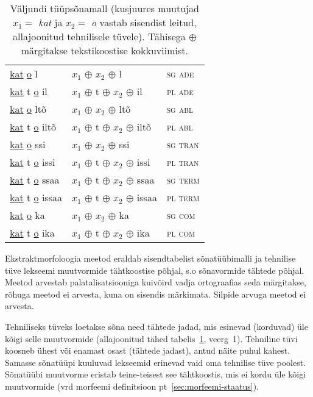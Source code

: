 \documentclass[12pt,a4paper]{article}
\begin{document}
\begin{table}[H]
\begin{minipage}[t]{.55\textwidth}
\begin{tabular}[t]{l l l}
      \underline{kat}   \underline{o} l     & $x_1$ $\oplus$ $x_2$ $\oplus$ l         & \textsc{sg ade} \\
      \underline{kat} t \underline{o} il    & $x_1$ $\oplus$ t $\oplus$ $x_2$ $\oplus$ il    & \textsc{pl ade} \\
      \underline{kat}   \underline{o} ltõ   & $x_1$ $\oplus$ $x_2$ $\oplus$ ltõ       & \textsc{sg abl} \\
      \underline{kat} t \underline{o} iltõ  & $x_1$ $\oplus$ t $\oplus$ $x_2$ $\oplus$ iltõ  & \textsc{pl abl} \\
      \underline{kat}   \underline{o} ssi   & $x_1$ $\oplus$ $x_2$ $\oplus$ ssi       & \textsc{sg tran} \\
      \underline{kat} t \underline{o} issi  & $x_1$ $\oplus$ t $\oplus$ $x_2$ $\oplus$ issi  & \textsc{pl tran} \\
      \underline{kat} t \underline{o} ssaa  & $x_1$ $\oplus$ t $\oplus$ $x_2$ $\oplus$ ssaa  & \textsc{sg term} \\
      \underline{kat} t \underline{o} issaa & $x_1$ $\oplus$ t $\oplus$ $x_2$ $\oplus$ issaa & \textsc{pl term} \\
      \underline{kat}   \underline{o} ka    & $x_1$ $\oplus$ $x_2$ $\oplus$ ka        & \textsc{sg com} \\
      \underline{kat} t \underline{o} ika   & $x_1$ $\oplus$ t $\oplus$ $x_2$ $\oplus$ ika   & \textsc{pl com} \\
    \end{tabular}
    \caption{Väljundi tüüpsõnamall (kus\-juures muutujad $x_1 = $ \textit{kat} ja $x_2 = $ \textit{o} vastab sisendist leitud, allajoonitud tehnilisele tüvele). Tähisega $\oplus$ märgitakse teksti\-koostise kokku\-viimist.}
    \label{tab:väljundtabel-katto}
  \end{minipage}
\end{table}

Ekstraktmorfoloogia meetod eraldab sisendtabelist sõna\-tüübi\-malli ja tehnilise tüve lekseemi muutvormide tähtkoostise põhjal, s.o sõnavormide tähtede põhjal. Meetod arvestab palatalisatsiooniga kuivõird vadja ortograafias seda märgitakse, rõhuga meetod ei arvesta, kuna on sisendis märkimata. Silpide arvuga meetod ei arvesta. %

Tehniliseks tüveks loetakse sõna need tähtede jadad, mis esinevad (korduvad) üle kõigi selle muutvormide (allajoonitud tähed tabelis~\ref{tab:väljundtabel-katto}, veerg~1). Tehniline tüvi koosneb ühest või enamast osast (tähtede jadast), antud näite puhul kahest. Samasse sõnatüüpi kuuluvad lekseemid erinevad vaid oma tehnilise tüve poolest. %
Sõnatüübi muutvorme eristab teine-teisest see tähtkoostis, mis ei kordu üle kõigi muutvormide (vrd morfeemi definitsioon pt~\ref{sec:morfeemi-staatus}).
\end{document}
